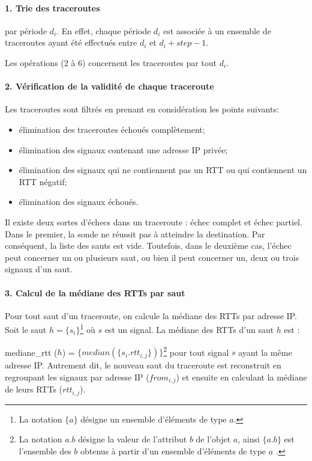 \paragraph{1. Trie des traceroutes } par période $d_i$. En effet, chaque période $d_i$ est associée à un ensemble de traceroutes ayant été effectués entre $d_i$ et $d_i + step - 1$. 




Les opérations  (2 à 6) concernent  les traceroutes par tout $d_i$.  

\paragraph{2. Vérification de la validité de chaque traceroute} 
Les traceroutes sont filtrés en prenant en considération  les points suivants:
\begin{itemize}
	\item élimination des traceroutes échoués complètement;
	\item élimination des signaux contenant une adresse IP privée;
	\item élimination des signaux qui ne contiennent pas un RTT ou  qui contiennent un RTT négatif;
	\item  élimination des signaux échoués.
\end{itemize}

Il existe deux sortes d'échecs dans un traceroute : échec complet et échec partiel. Dans le premier,   la sonde ne réussit pas à atteindre la destination. Par conséquent, la liste des sauts est vide. Toutefois, dans le deuxième cas, l'échec peut concerner un ou plusieurs saut, ou bien il peut concerner un, deux ou trois signaux d'un saut.


\paragraph{3. Calcul de la médiane des RTTs par saut} Pour tout saut d'un traceroute,  on calcule la médiane des RTTs par adresse IP. Soit le saut $h =\{s_i \}$\footnote{La notation $\{ a\}$ désigne un ensemble d'éléments de type $a$.} où $s$ est un  signal. La médiane des RTTs d'un saut $h$ est  :

mediane\_rtt ($h$) =  $\{median(\{s_i.rtt_{i, j}\})\}$\footnote{La notation $a.b$ désigne la valeur de l'attribut $b$ de l'objet $a$, ainsi $\{a.b\}$ est l'ensemble des $b$ obtenus à partir d'un ensemble d'éléments de type $a$ .}  pour tout signal $s$ ayant la même adresse IP. Autrement dit, le nouveau saut du traceroute est reconstruit en regroupant les signaux par adresse IP ($ from_{i, j} $) et ensuite en calculant la médiane de leurs RTTs ($rtt_{i,j}$). 




